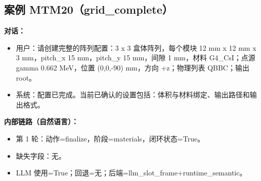 \documentclass[11pt]{ctexart}
\begin{document}
\subsection{案例 MTM20（grid\_complete）}
\textbf{对话：}
\begin{itemize}
\item 用户：请创建完整的阵列配置：3 x 3 盒体阵列，每个模块 12 mm x 12 mm x 3 mm，pitch\_x 15 mm，pitch\_y 15 mm，间隙 1 mm，材料 G4\_CsI；点源 gamma 0.662 MeV，位置 (0,0,-90) mm，方向 +z；物理列表 QBBC；输出 root。
\item 系统：配置已完成。当前已确认的设置包括：体积与材料绑定、输出路径和输出格式。
\end{itemize}
\textbf{内部链路（自然语言）：}
\begin{itemize}
\item 第 1 轮：动作=finalize，阶段=materials，闭环状态=True。
\item 缺失字段：无。
\item LLM 使用=True；回退=无；后端=llm\_slot\_frame+runtime\_semantic。
\end{itemize}
\end{document}
